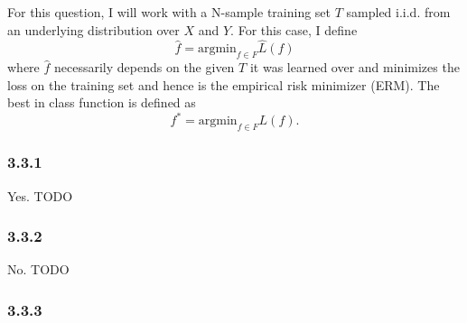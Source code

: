\documentclass[12pt]{amsart}
\begin{document}
For this question, I will work with a N-sample training set $T$ sampled i.i.d. from an underlying distribution over $X$ and $Y$.  For this case, I define 
\begin{equation} \label{eqn:fhat}
\hat{f} = \text{argmin}_{f \in F}\hat{L}(f)
\end{equation}
where $\hat{f}$ necessarily depends on the given $T$ it was learned over and minimizes the loss on the training set and hence is the empirical risk minimizer (ERM).  The best in class function is defined as
\begin{equation} \label{eqn:fstar}
f^* = \text{argmin}_{f \in F}L(f).
\end{equation}

\subsubsection*{3.3.1}

Yes.  TODO

\subsubsection*{3.3.2}

No.   TODO

\subsubsection*{3.3.3}
\end{document}
